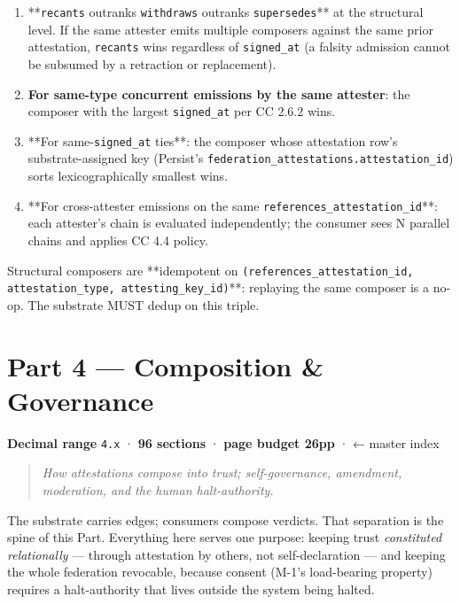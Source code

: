 \documentclass[11pt]{article}
\begin{document}
\begin{enumerate}\setlength\itemsep{0pt}
\item **\texttt{recants} outranks \texttt{withdraws} outranks \texttt{supersedes}** at the structural level. If the same attester emits multiple composers against the same prior attestation, \texttt{recants} wins regardless of \texttt{signed\_at} (a falsity admission cannot be subsumed by a retraction or replacement).
\item \textbf{For same-type concurrent emissions by the same attester}: the composer with the largest \texttt{signed\_at} per CC 2.6.2 wins.
\item **For same-\texttt{signed\_at} ties**: the composer whose attestation row's substrate-assigned key (Persist's \texttt{federation\_attestations.attestation\_id}) sorts lexicographically smallest wins.
\item **For cross-attester emissions on the same \texttt{references\_attestation\_id}**: each attester's chain is evaluated independently; the consumer sees N parallel chains and applies CC 4.4 policy.
\end{enumerate}


Structural composers are **idempotent on \texttt{(references\_attestation\_id, attestation\_type, attesting\_key\_id)}**: replaying the same composer is a no-op. The substrate MUST dedup on this triple.


\clearpage
\section*{Part 4 — Composition \& Governance}


\textbf{Decimal range} \texttt{4.x} · \textbf{96 sections} · \textbf{page budget 26pp} · ← master index


\begin{quote}\itshape How attestations compose into trust; self-governance, amendment, moderation, and the human halt-authority.\end{quote}


The substrate carries edges; consumers compose verdicts. That separation is the spine of this Part. Everything here serves one purpose: keeping trust \textit{constituted relationally} — through attestation by others, not self-declaration — and keeping the whole federation revocable, because consent (M-1's load-bearing property) requires a halt-authority that lives outside the system being halted.
\end{document}
